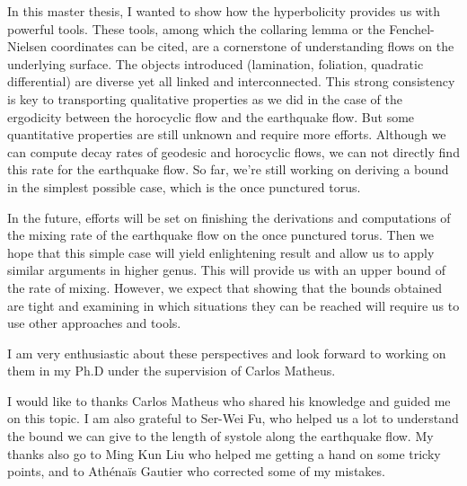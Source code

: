 In this master thesis, I wanted to show how the hyperbolicity provides us with powerful tools. These tools, among which the collaring lemma or the Fenchel-Nielsen coordinates can be cited, are a cornerstone of understanding flows on the underlying surface. The objects introduced (lamination, foliation, quadratic differential) are diverse yet all linked and interconnected. This strong consistency is key to transporting qualitative properties as we did in the case of the ergodicity between the horocyclic flow and the earthquake flow. But some quantitative properties are still unknown and require more efforts. Although we can compute decay rates of geodesic and horocyclic flows, we can not directly find this rate for the earthquake flow. So far, we're still working on deriving a bound in the simplest possible case, which is the once punctured torus.


In the future, efforts will be set on finishing the derivations and computations of the mixing rate of the earthquake flow on the once punctured torus. Then we hope that this simple case will yield enlightening result and allow us to apply similar arguments in higher genus. This will provide us with an upper bound of the rate of mixing. However, we expect that showing that the bounds obtained are tight and examining in which situations they can be reached will require us to use other approaches and tools.

I am very enthusiastic about these perspectives and look forward to working on them in my Ph.D under the supervision of Carlos Matheus.

I would like to thanks Carlos Matheus who shared his knowledge and guided me on this topic. I am also grateful to Ser-Wei Fu, who helped us a lot to understand the bound we can give to the length of systole along the earthquake flow. My thanks also go to Ming Kun Liu who helped me getting a hand on some tricky points, and to Athénaïs Gautier who corrected some of my mistakes.

